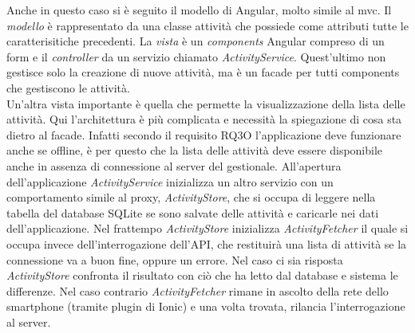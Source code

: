 Anche in questo caso si è seguito il modello di Angular, molto simile al \acrlong{mvc}. Il \textit{modello} è rappresentato da
una classe attività che possiede come attributi tutte le caratterisitiche precedenti. La \textit{vista} è un \textit{components} Angular compreso di un form e
il \textit{controller} da un servizio chiamato \textit{ActivityService}. Quest'ultimo non gestisce solo la creazione di nuove attività, ma è
un \gls{facade} per tutti components che gestiscono le attività. \\
Un'altra vista importante è quella che permette la visualizzazione della lista delle attività. Qui l'architettura è più complicata e
necessità la spiegazione di cosa sta dietro al \gls{facade}. Infatti secondo il requisito RQ3O l'applicazione deve funzionare anche se
offline, è per questo che la lista delle attività deve essere disponibile anche in assenza di connessione al server del gestionale.
All'apertura dell'applicazione \textit{ActivityService} inizializza un altro servizio con un comportamento simile al \gls{proxy},
\textit{ActivityStore}, che si occupa di leggere nella tabella del database SQLite se sono salvate delle attività e caricarle nei dati
dell'applicazione. Nel frattempo \textit{ActivityStore} inizializza \textit{ActivityFetcher} il quale si occupa invece dell'interrogazione
dell'API, che restituirà una lista di attività se la connessione va a buon fine, oppure un errore.  Nel caso ci sia risposta
\textit{ActivityStore} confronta il risultato con ciò che ha letto dal database e sistema le differenze. Nel caso contrario
\textit{ActivityFetcher} rimane in ascolto della rete dello smartphone (tramite plugin di Ionic) e una volta trovata, rilancia
l'interrogazione al server. 

